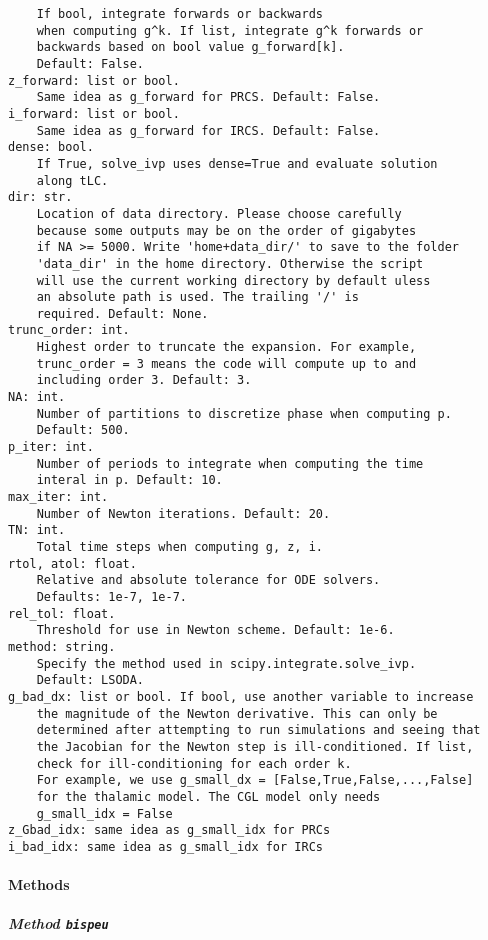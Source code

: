 \documentclass[
  english,
  a4paper,
  oneside]{article}
\begin{document}
\begin{verbatim}
    If bool, integrate forwards or backwards
    when computing g^k. If list, integrate g^k forwards or
    backwards based on bool value g_forward[k].
    Default: False.
z_forward: list or bool.
    Same idea as g_forward for PRCS. Default: False.
i_forward: list or bool.
    Same idea as g_forward for IRCS. Default: False.
dense: bool.
    If True, solve_ivp uses dense=True and evaluate solution
    along tLC.
dir: str.
    Location of data directory. Please choose carefully
    because some outputs may be on the order of gigabytes
    if NA >= 5000. Write 'home+data_dir/' to save to the folder
    'data_dir' in the home directory. Otherwise the script
    will use the current working directory by default uless
    an absolute path is used. The trailing '/' is
    required. Default: None.
trunc_order: int.
    Highest order to truncate the expansion. For example, 
    trunc_order = 3 means the code will compute up to and 
    including order 3. Default: 3.
NA: int.
    Number of partitions to discretize phase when computing p.
    Default: 500.
p_iter: int.
    Number of periods to integrate when computing the time 
    interal in p. Default: 10.
max_iter: int.
    Number of Newton iterations. Default: 20.
TN: int.
    Total time steps when computing g, z, i.
rtol, atol: float.
    Relative and absolute tolerance for ODE solvers.
    Defaults: 1e-7, 1e-7.
rel_tol: float.
    Threshold for use in Newton scheme. Default: 1e-6.
method: string.
    Specify the method used in scipy.integrate.solve_ivp.
    Default: LSODA.
g_bad_dx: list or bool. If bool, use another variable to increase
    the magnitude of the Newton derivative. This can only be
    determined after attempting to run simulations and seeing that
    the Jacobian for the Newton step is ill-conditioned. If list,
    check for ill-conditioning for each order k.
    For example, we use g_small_dx = [False,True,False,...,False]
    for the thalamic model. The CGL model only needs
    g_small_idx = False
z_Gbad_idx: same idea as g_small_idx for PRCs
i_bad_idx: same idea as g_small_idx for IRCs
\end{verbatim}

\hypertarget{methods}{%
\paragraph{Methods}\label{methods}}

\hypertarget{StrongCoupling.StrongCoupling.bispeu}{%
\subparagraph{\texorpdfstring{Method
\texttt{bispeu}}{Method bispeu}}\label{StrongCoupling.StrongCoupling.bispeu}}
\end{document}
